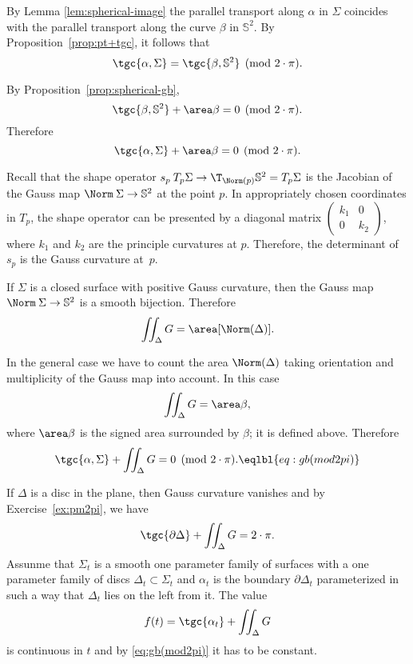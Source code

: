 By Lemma \ref{lem:spherical-image} the parallel transport along $\alpha$ in $\Sigma$ coincides with the parallel transport along the curve $\beta$ in $\mathbb{S}^2$.
By Proposition~\ref{prop:pt+tgc}, it follows that 
\[\tgc{\alpha,\Sigma}=\tgc{\beta,\mathbb{S}^2} \pmod{2\cdot \pi}.\]

By Proposition~\ref{prop:spherical-gb},
\[\tgc{\beta,\mathbb{S}^2}+\area\beta=0\pmod{2\cdot \pi}.\]
Therefore 
\[\tgc{\alpha,\Sigma}+\area\beta=0\pmod{2\cdot \pi}.\]

Recall that the shape  operator $s_p\: T_p\Sigma \to \T_{\Norm(p)}\mathbb{S}^2=T_p\Sigma$ is the Jacobian of the Gauss map $\Norm\:\Sigma\to \mathbb{S}^2$ at the point $p$.
In appropriately chosen coordinates in $T_p$, the shape operator can be presented by a diagonal matrix 
$\left(\begin{smallmatrix}
k_1&0
\\
0&k_2
\end{smallmatrix}\right)$, where $k_1$ and $k_2$ are the principle curvatures at $p$.
Therefore, the determinant of $s_p$ is the Gauss curvature at~$p$.

If $\Sigma$ is a closed surface with positive Gauss curvature, then the Gauss map $\Norm\:\Sigma\to\mathbb{S}^2$ is a smooth bijection.
Therefore 
\[\iint_\Delta G=\area[\Norm(\Delta)].\]

In the general case we have to count the area $\Norm(\Delta)$ taking orientation and multiplicity of the Gauss map into account.
In this case 
\[\iint_\Delta G=\area\beta,\]
where $\area\beta$ is the signed area surrounded by $\beta$; it is defined above.
Therefore 
\[\tgc{\alpha,\Sigma}+\iint_\Delta G=0\pmod{2\cdot \pi}.\eqlbl{eq:gb(mod2pi)}\]

If $\Delta$ is a disc in the plane, then Gauss curvature vanishes and by Exercise~\ref{ex:pm2pi}, we have 
\[\tgc{\partial\Delta}+\iint_\Delta G=2\cdot \pi.\]
Assunme that $\Sigma_t$ is a smooth one parameter family of surfaces with 
a one parameter family of discs $\Delta_t\subset \Sigma_t$ and $\alpha_t$ is the boundary $\partial\Delta_t$ parameterized in such a way that $\Delta_t$ lies on the left from it.
The value 
\[f(t)=\tgc{\alpha_t}+\iint_\Delta G\]
is continuous in $t$ and by \ref{eq:gb(mod2pi)} it has to be constant.

